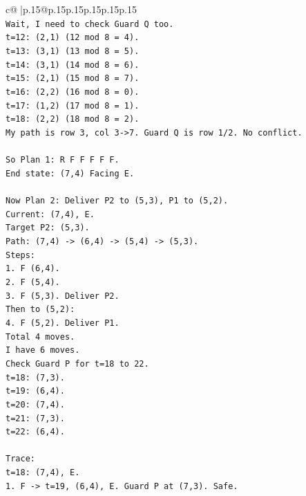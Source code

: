 \documentclass{article}
\begin{document}
{\begin{supertabular}{c@{$\;$}|p{.15\linewidth}@{}p{.15\linewidth}p{.15\linewidth}p{.15\linewidth}p{.15\linewidth}p{.15\linewidth}}
{{{\\ 
\texttt{Wait, I need to check Guard Q too.} \\
\texttt{t=12: (2,1) (12 mod 8 = 4).} \\
\texttt{t=13: (3,1) (13 mod 8 = 5).} \\
\texttt{t=14: (3,1) (14 mod 8 = 6).} \\
\texttt{t=15: (2,1) (15 mod 8 = 7).} \\
\texttt{t=16: (2,2) (16 mod 8 = 0).} \\
\texttt{t=17: (1,2) (17 mod 8 = 1).} \\
\texttt{t=18: (2,2) (18 mod 8 = 2).} \\
\texttt{My path is row 3, col 3{-}>7. Guard Q is row 1/2. No conflict.} \\
\\ 
\texttt{So Plan 1: R F F F F F.} \\
\texttt{End state: (7,4) Facing E.} \\
\\ 
\texttt{Now Plan 2: Deliver P2 to (5,3), P1 to (5,2).} \\
\texttt{Current: (7,4), E.} \\
\texttt{Target P2: (5,3).} \\
\texttt{Path: (7,4) {-}> (6,4) {-}> (5,4) {-}> (5,3).} \\
\texttt{Steps:} \\
\texttt{1. F (6,4).} \\
\texttt{2. F (5,4).} \\
\texttt{3. F (5,3). Deliver P2.} \\
\texttt{Then to (5,2):} \\
\texttt{4. F (5,2). Deliver P1.} \\
\texttt{Total 4 moves.} \\
\texttt{I have 6 moves.} \\
\texttt{Check Guard P for t=18 to 22.} \\
\texttt{t=18: (7,3).} \\
\texttt{t=19: (6,4).} \\
\texttt{t=20: (7,4).} \\
\texttt{t=21: (7,3).} \\
\texttt{t=22: (6,4).} \\
\\ 
\texttt{Trace:} \\
\texttt{t=18: (7,4), E.} \\
\texttt{1. F {-}> t=19, (6,4), E. Guard P at (7,3). Safe.} \\
}}}
\end{supertabular}}
\end{document}
